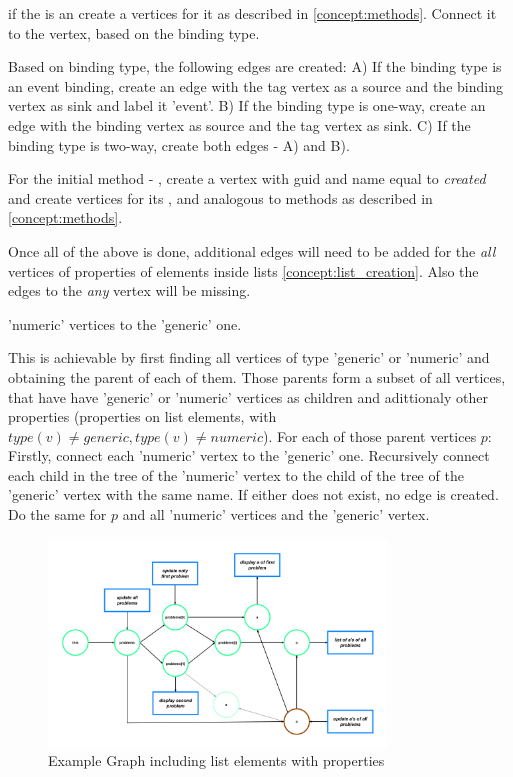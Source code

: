 if the  is an  create a vertices for it as described in \ref{concept:methods}. Connect it to the  vertex, based on the binding type.

Based on binding type, the following edges are created:
A) If the binding type is an event binding, create an 
edge with the tag vertex as a source and the binding vertex as sink and label it 'event'. 
B) If the binding type is one-way, create an edge with the binding vertex as source and the tag vertex as sink.
C) If the binding type is two-way, create both edges - A) and B).

For the initial method - , create a vertex with \gls{guid} and name equal to \textit{created} and create vertices for its ,  and  analogous to methods as described in \ref{concept:methods}. 


Once all of the above is done, additional edges will need to be added for the \textit{all} vertices of properties of elements inside lists \ref{concept:list_creation}. Also the edges to the \textit{any} vertex will be missing. 

'numeric' vertices to the 'generic' one. 

This is achievable by first finding all vertices of type 'generic' or 'numeric' and obtaining the parent of each of them. Those parents form a subset of all vertices, that have have 'generic' or 'numeric' vertices as children and adittionaly other properties (properties on list elements, with $type(v) \neq generic, type(v) \neq numeric$). 
For each of those parent vertices $p$:
Firstly, connect each 'numeric' vertex to the 'generic' one. Recursively connect each child in the tree of the 'numeric' vertex to the child of the tree of the 'generic' vertex with the same name. If either does not exist, no edge is created. Do the same for $p$ and all 'numeric' vertices and the 'generic' vertex.

\begin{figure}[H]
    \includegraphics[width=0.8\textwidth]{images/graph_complete_example.png}
     \caption{Example Graph including list elements with properties}
     \label{fig:graph_complete_example}
\end{figure}

